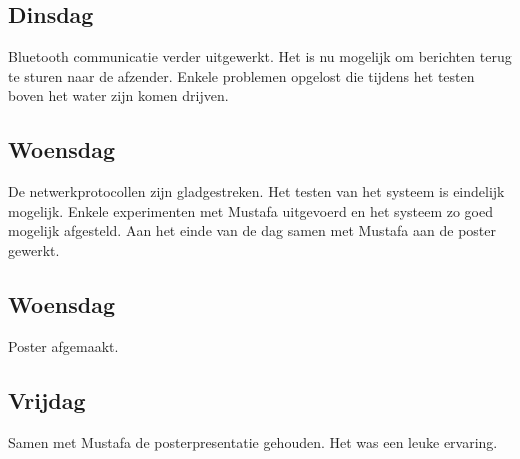 \documentclass[12pt]{article}
\begin{document}
\subsection*{Dinsdag}
Bluetooth communicatie verder uitgewerkt. Het is nu mogelijk om berichten terug te sturen naar de afzender. Enkele problemen opgelost die tijdens het testen boven het water zijn komen drijven. 

\subsection*{Woensdag}
De netwerkprotocollen zijn gladgestreken. Het testen van het systeem is eindelijk mogelijk. Enkele experimenten met Mustafa uitgevoerd en het systeem zo goed mogelijk afgesteld. Aan het einde van de dag samen met Mustafa aan de poster gewerkt.

\subsection*{Woensdag}
Poster afgemaakt.

\subsection*{Vrijdag}
Samen met Mustafa de posterpresentatie gehouden. Het was een leuke ervaring.
\end{document}
